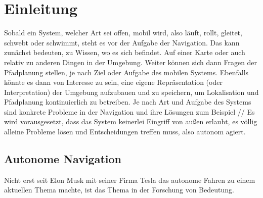 %


\chapter{Einleitung}


Sobald ein System, welcher Art sei offen, mobil wird, also läuft, rollt, gleitet, schwebt oder schwimmt, steht es vor der Aufgabe der Navigation. Das kann zunächst bedeuten, zu Wissen, wo es sich befindet. Auf einer Karte oder auch relativ zu anderen \glqq Dingen\grqq{}  in der Umgebung. Weiter können sich dann Fragen der Pfadplanung stellen, je nach Ziel oder Aufgabe des mobilen Systems. Ebenfalls könnte es dann von Interesse zu sein, eine eigene Repräsentation (oder Interpretation) der Umgebung aufzubauen und zu speichern, um Lokalisation und Pfadplanung kontinuierlich zu betreiben. Je nach Art und Aufgabe des Systems sind konkrete Probleme in der Navigation und ihre Lösungen zum Beispiel  //
Es wird vorausgesetzt, dass das System keinerlei Eingriff von außen erlaubt, es völlig alleine Probleme lösen und Entscheidungen treffen muss, also autonom agiert.



\section{Autonome Navigation}

Nicht erst seit Elon Musk mit seiner Firma Tesla das autonome Fahren zu einem aktuellen Thema machte, ist das Thema in der Forschung von Bedeutung.



